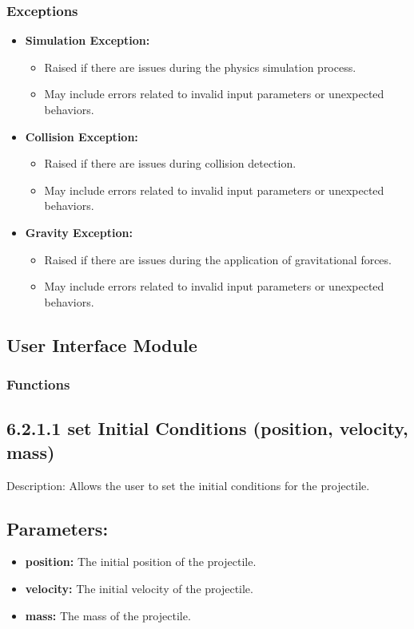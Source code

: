 \documentclass[12pt, titlepage]{article}
\begin{document}
\subsubsection{Exceptions}
\begin{itemize}
  \item \textbf{Simulation Exception:}

  \begin{itemize}
  \item Raised if there are issues during the physics simulation process.
  \item May include errors related to invalid input parameters or unexpected behaviors.
    \end{itemize}
  \item \textbf{Collision Exception:}
    \begin{itemize}
  \item Raised if there are issues during collision detection.
  \item May include errors related to invalid input parameters or unexpected behaviors.
    \end{itemize}
  \item \textbf{Gravity Exception:}
    \begin{itemize}
  \item Raised if there are issues during the application of gravitational forces.
  \item May include errors related to invalid input parameters or unexpected behaviors.
    \end{itemize}
\end{itemize}

\subsection{User Interface Module}
\subsubsection{Functions}

\subsection*{6.2.1.1 set Initial Conditions (position, velocity, mass)}
Description: Allows the user to set the initial conditions for the projectile.

\subsection*{Parameters:}
\begin{itemize}
  \item \textbf{position:} The initial position of the projectile.
  \item \textbf{velocity:} The initial velocity of the projectile.
  \item \textbf{mass:} The mass of the projectile.
\end{itemize}
\end{document}
